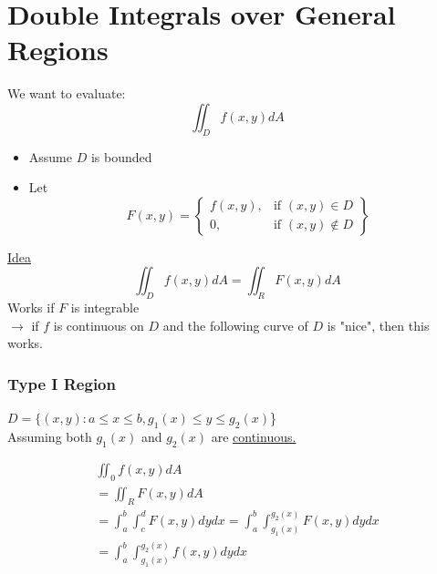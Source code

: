 \documentclass[12pt]{article}
\begin{document}
\section{Double Integrals over General Regions}
We want to evaluate:
\[
	\iint_{D}f(x,y)dA
\]
\begin{itemize}
	\item Assume \(D\) is bounded
	\item Let \[
		F(x,y) = 
		\begin{Bmatrix}
			f(x,y), & \text{if } (x,y) \in D \\
			0, & \text{if } (x,y) \notin D
		\end{Bmatrix}
	\]
\end{itemize}

\underline{Idea}
\[
	\iint_{D}f(x,y)dA = \iint_{R}F(x,y)dA
\]
Works if \(F\) is integrable\\
\(\rightarrow \) if \(f\) is continuous on \(D\) and the following curve of \(D\) is "nice", then this works.

\subsubsection{Type I Region}
\(D = \{(x,y): a \leq x \leq b, g_1(x) \leq y \leq g_2(x)\)\}\\
Assuming both \(g_1(x)\) and \(g_2(x)\) are \underline{continuous.}

\begin{align*}
	\label{eq:General Equation}
	\iint_{0}f(x,y)dA \\
	 = \iint_{R}F(x,y) dA \\ 
	 = \int_{a}^{b} \int_{c}^{d} F(x,y)dydx
	 = \int_{a}^{b} \int_{g_1(x)}^{g_2(x)} F(x,y)dydx	\\
	 = \int_{a}^{b} \int_{g_1(x)}^{g_2(x)} f(x,y)dydx
\end{align*} 
\end{document}
